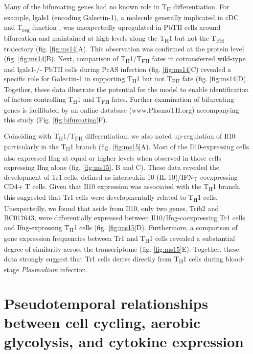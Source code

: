 Many of the bifurcating genes had no known role in T\textsubscript{H} differentiation. For example, lgals1 (encoding Galectin-1), a molecule generally implicated in cDC \cite{Poncini2015-um} and T\textsubscript{reg} function \cite{Garin2007-go}, was unexpectedly upregulated in PbTII cells around bifurcation and maintained at high levels along the T\textsubscript{H}1 but not the T\textsubscript{FH} trajectory (fig.  \ref{fig:ms14}A). This observation was confirmed at the protein level (fig.  \ref{fig:ms14}B). Next, comparison of T\textsubscript{H}1/T\textsubscript{FH} fates in cotransferred wild-type and lgals1-/- PbTII cells during PcAS infection (fig.  \ref{fig:ms14}C) revealed a specific role for Galectin-1 in supporting T\textsubscript{H}1 but not T\textsubscript{FH} fate (fig.  \ref{fig:ms14}D). Together, these data illustrate the potential for the  model to enable identification of factors controlling T\textsubscript{H}1 and T\textsubscript{FH} fates. Further examination of bifurcating genes is facilitated by an online database (www.PlasmoTH.org) accompanying this study (Fig.  \ref{fig:bifurcating}F).

Coinciding with T\textsubscript{H}1/T\textsubscript{FH} differentiation, we also noted up-regulation of Il10 particularly in the T\textsubscript{H}1 branch (fig.  \ref{fig:ms15}A). Most of the Il10-expressing cells also expressed Ifng at equal or higher levels when observed in those cells expressing Ifng alone (fig.  \ref{fig:ms15}, B and C). These data revealed the development of Tr1 cells, defined as interleukin-10 (IL-10)/IFN\( \gamma \)–coexpressing CD4+ T cells. Given that Il10 expression was associated with the T\textsubscript{H}1 branch, this suggested that Tr1 cells were developmentally related to T\textsubscript{H}1 cells. Unexpectedly, we found that aside from Il10, only two genes, Trib2 and BC017643, were differentially expressed between Il10/Ifng-coexpressing Tr1 cells and Ifng-expressing T\textsubscript{H}1 cells (fig.  \ref{fig:ms15}D). Furthermore, a comparison of gene expression frequencies between Tr1 and T\textsubscript{H}1 cells revealed a substantial degree of similarity across the transcriptome (fig.  \ref{fig:ms15}E). Together, these data strongly suggest that Tr1 cells derive directly from T\textsubscript{H}1 cells during blood-stage \textit{Plasmodium} infection.

\section{Pseudotemporal relationships between cell cycling, aerobic glycolysis, and cytokine expression}

